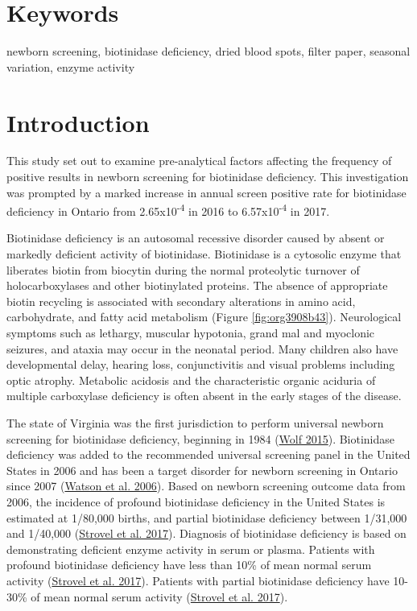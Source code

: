 \documentclass[review]{elsarticle}
\begin{document}
\section*{Keywords}
\label{sec:org57a1784}
newborn screening, biotinidase deficiency, dried blood spots, filter
paper, seasonal variation, enzyme activity
\section*{Introduction}
\label{sec:org346d980}
This study set out to examine pre-analytical factors affecting the
frequency of positive results in newborn screening for biotinidase
deficiency. This investigation was prompted by a marked increase in
annual screen positive rate for biotinidase deficiency in Ontario from
2.65x10\textsuperscript{-4} in 2016 to 6.57x10\textsuperscript{-4} in 2017.

Biotinidase deficiency is an autosomal recessive disorder caused by
absent or markedly deficient activity of biotinidase.  Biotinidase is
a cytosolic enzyme that liberates biotin from biocytin during the
normal proteolytic turnover of holocarboxylases and other biotinylated
proteins. The absence of appropriate biotin recycling is associated
with secondary alterations in amino acid, carbohydrate, and fatty acid
metabolism (Figure \ref{fig:org3908b43}). Neurological symptoms such as lethargy,
muscular hypotonia, grand mal and myoclonic seizures, and ataxia may
occur in the neonatal period. Many children also have developmental
delay, hearing loss, conjunctivitis and visual problems including
optic atrophy. Metabolic acidosis and the characteristic organic
aciduria of multiple carboxylase deficiency is often absent in the
early stages of the disease.

The state of Virginia was the first jurisdiction to perform universal
newborn screening for biotinidase deficiency, beginning in 1984 (\hyperlink{citeproc_bib_item_12}{Wolf 2015}). Biotinidase deficiency was added to the recommended
universal screening panel in the United States in 2006 and has been a
target disorder for newborn screening in Ontario since 2007 (\hyperlink{citeproc_bib_item_10}{Watson et al. 2006}).  Based on newborn screening outcome data from
2006, the incidence of profound biotinidase deficiency in the United
States is estimated at 1/80,000 births, and partial biotinidase
deficiency between 1/31,000 and 1/40,000 (\hyperlink{citeproc_bib_item_7}{Strovel et al. 2017}). Diagnosis of biotinidase deficiency is based on
demonstrating deficient enzyme activity in serum or plasma. Patients
with profound biotinidase deficiency have less than 10\% of mean normal
serum activity (\hyperlink{citeproc_bib_item_7}{Strovel et al. 2017}). Patients with partial biotinidase
deficiency have 10-30\% of mean normal serum activity (\hyperlink{citeproc_bib_item_7}{Strovel et al. 2017}).
\end{document}
